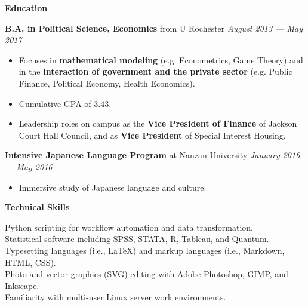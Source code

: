 \documentclass[12pt]{article}
\newenvironment{details}{
\begin{itemize}[label={}]
  \small \setlength{\itemsep}{0pt}
}{\end{itemize}}
\begin{document}
\vspace{.2in}
\large
\textbf{Education} \hrulefill

\vspace{.1in}
\normalsize
\textbf{B.A. in Political Science, Economics} from U Rochester \hfill \textit{August 2013 --- May 2017}
\begin{details}
  \item Focuses in \textbf{mathematical modeling} (e.g. Econometrics, Game Theory) and in the \textbf{interaction of government and the private sector} (e.g. Public Finance, Political Economy, Health Economics).
  \item Cumulative GPA of $3.43$.
  \item Leadership roles on campus as the \textbf{Vice President of Finance} of Jackson Court Hall Council, and as \textbf{Vice President} of Special Interest Housing.
\end{details}

\vspace{.1in}
\normalsize
\textbf{Intensive Japanese Language Program} at Nanzan University \hfill \textit{January 2016 --- May 2016}
\begin{details}
  \item Immersive study of Japanese language and culture. \\
\end{details}

\vspace{.2in}
\large
\textbf{Technical Skills} \hrulefill

\normalsize
\onehalfspacing
\begin{flushleft}
  Python scripting for workflow automation and data transformation. \\
  Statistical software including SPSS, STATA, R, Tableau, and Quantum. \\
  Typesetting languages (i.e., \LaTeX) and markup languages (i.e., Markdown, HTML, CSS). \\
  Photo and vector graphics (SVG) editing with Adobe Photoshop, GIMP, and Inkscape. \\
  Familiarity with multi-user Linux server work environments.
\end{flushleft}
\end{document}
